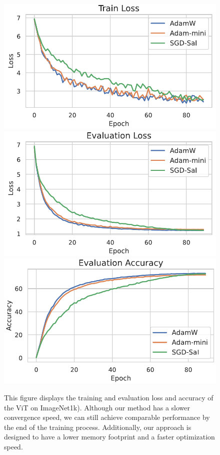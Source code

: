 
\begin{figure}[!ht]
    \centering
    \includegraphics[width=0.33\linewidth]{images/vit_trainloss.pdf}
    \includegraphics[width=0.33\linewidth]{images/vit_evalloss.pdf}
    \includegraphics[width=0.33\linewidth]{images/vit_evalacc.pdf}
    \caption{This figure displays the training and evaluation loss and accuracy of the ViT on ImageNet1k). Although our method has a slower convergence speed, we can still achieve comparable performance by the end of the training process. Additionally, our approach is designed to have a lower memory footprint and a faster optimization speed. }
    \label{fig:vit_loss_acc_across_time}
\end{figure}

